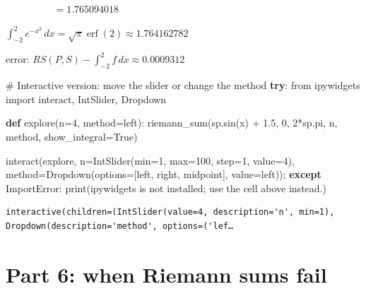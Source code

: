\documentclass[
  letterpaper,
  DIV=11,
  numbers=noendperiod]{scrreprt}
\newenvironment{Shaded}{\begin{snugshade}}{\end{snugshade}}
\newcommand{\BuiltInTok}[1]{\textcolor[rgb]{0.00,0.23,0.31}{#1}}
\newcommand{\CommentTok}[1]{\textcolor[rgb]{0.37,0.37,0.37}{#1}}
\newcommand{\ControlFlowTok}[1]{\textcolor[rgb]{0.00,0.23,0.31}{\textbf{#1}}}
\newcommand{\DecValTok}[1]{\textcolor[rgb]{0.68,0.00,0.00}{#1}}
\newcommand{\FloatTok}[1]{\textcolor[rgb]{0.68,0.00,0.00}{#1}}
\newcommand{\ImportTok}[1]{\textcolor[rgb]{0.00,0.46,0.62}{#1}}
\newcommand{\KeywordTok}[1]{\textcolor[rgb]{0.00,0.23,0.31}{\textbf{#1}}}
\newcommand{\NormalTok}[1]{\textcolor[rgb]{0.00,0.23,0.31}{#1}}
\newcommand{\OperatorTok}[1]{\textcolor[rgb]{0.37,0.37,0.37}{#1}}
\newcommand{\PreprocessorTok}[1]{\textcolor[rgb]{0.68,0.00,0.00}{#1}}
\newcommand{\StringTok}[1]{\textcolor[rgb]{0.13,0.47,0.30}{#1}}
\newcommand{\VariableTok}[1]{\textcolor[rgb]{0.07,0.07,0.07}{#1}}
\theoremstyle{plain}
\theoremstyle{plain}
\theoremstyle{definition}
\theoremstyle{definition}
\theoremstyle{definition}
\theoremstyle{plain}
\theoremstyle{plain}
\theoremstyle{remark}
\begin{document}
$\displaystyle \phantom{RS(P, S)} = \mathbf{1.765094018}$

$\displaystyle \int_{-2}^{2} e^{- x^{2}}\, dx = \sqrt{\pi} \operatorname{erf}{\left(2 \right)} \approx 1.764162782$

$\displaystyle \text{error: } RS(P, S) - \int_{-2}^{2} f\,dx \approx 0.0009312$

\begin{Shaded}
\begin{Highlighting}[]
\CommentTok{\# Interactive version: move the slider or change the method}
\ControlFlowTok{try}\NormalTok{:}
    \ImportTok{from}\NormalTok{ ipywidgets }\ImportTok{import}\NormalTok{ interact, IntSlider, Dropdown}

    \KeywordTok{def}\NormalTok{ explore(n}\OperatorTok{=}\DecValTok{4}\NormalTok{, method}\OperatorTok{=}\StringTok{\textquotesingle{}left\textquotesingle{}}\NormalTok{):}
\NormalTok{        riemann\_sum(sp.sin(x) }\OperatorTok{+} \FloatTok{1.5}\NormalTok{, }\DecValTok{0}\NormalTok{, }\DecValTok{2}\OperatorTok{*}\NormalTok{sp.pi, n, method, show\_integral}\OperatorTok{=}\VariableTok{True}\NormalTok{)}

\NormalTok{    interact(explore,}
\NormalTok{             n}\OperatorTok{=}\NormalTok{IntSlider(}\BuiltInTok{min}\OperatorTok{=}\DecValTok{1}\NormalTok{, }\BuiltInTok{max}\OperatorTok{=}\DecValTok{100}\NormalTok{, step}\OperatorTok{=}\DecValTok{1}\NormalTok{, value}\OperatorTok{=}\DecValTok{4}\NormalTok{),}
\NormalTok{             method}\OperatorTok{=}\NormalTok{Dropdown(options}\OperatorTok{=}\NormalTok{[}\StringTok{\textquotesingle{}left\textquotesingle{}}\NormalTok{, }\StringTok{\textquotesingle{}right\textquotesingle{}}\NormalTok{, }\StringTok{\textquotesingle{}midpoint\textquotesingle{}}\NormalTok{], value}\OperatorTok{=}\StringTok{\textquotesingle{}left\textquotesingle{}}\NormalTok{))}\OperatorTok{;}
\ControlFlowTok{except} \PreprocessorTok{ImportError}\NormalTok{:}
    \BuiltInTok{print}\NormalTok{(}\StringTok{\textquotesingle{}ipywidgets is not installed; use the cell above instead.\textquotesingle{}}\NormalTok{)}
\end{Highlighting}
\end{Shaded}

\begin{verbatim}
interactive(children=(IntSlider(value=4, description='n', min=1), Dropdown(description='method', options=('lef…
\end{verbatim}

\section{Part 6: when Riemann sums
fail}\label{part-6-when-riemann-sums-fail}
\end{document}
